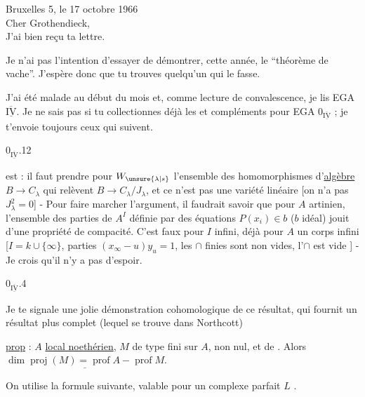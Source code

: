
Bruxelles 5, le 17 octobre 1966\\

Cher Grothendieck,\\

J'ai bien reçu ta lettre.

Je n'ai pas l'intention d'essayer de démontrer, cette année, le ``théorème de  vache''. J'espère donc que tu trouves quelqu'un qui le fasse.

J'ai été malade au début du mois et, comme lecture de convalescence, je lis EGA $\overline{\underline{\mathrm{IV}}}$. Je ne sais pas si tu collectionnes déjà les  et compléments pour EGA $0_{\overline{\underline{\mathrm{IV}}}}$ ; je t'envoie toujours ceux qui suivent.

$0_{\overline{\underline{\mathrm{IV}}}}$.12


est  : il faut prendre pour $W_{\unsure{\lambda|s}}$ l'ensemble des homomorphismes d'\uline{algèbre} $B\longrightarrow C_\lambda$ qui relèvent $B\longrightarrow C_\lambda/J_\lambda$, et ce n'est pas une variété linéaire [on n'a pas $J_\lambda^2=0$] - Pour faire marcher l'argument, il faudrait savoir que pour $A$ artinien, l'ensemble des parties de $A^I$ définie par  des équations $P(x_i)\in b$ ($b$ idéal) jouit d'une propriété de compacité. C'est faux pour $I$ infini, déjà pour $A$ un corps infini [$I=k\cup\{\infty\}$, parties $(x_\infty-u)y_u=1$, les $\cap$ finies sont non vides, l'$\cap$ est vide ] - Je crois qu'il n'y a pas d'espoir.

$0_{\overline{\underline{\mathrm{IV}}}}$.4

Je te signale une jolie démonstration cohomologique de ce résultat, qui fournit un résultat plus complet (lequel se trouve dans Northcott)


\uline{prop} : $A$ \uline{local noethérien}, $M$ de type fini sur $A$, non nul, et de . Alors $\underline{\dim\operatorname{proj}(M)=\operatorname{prof} A-\operatorname{prof} M}$.

On utilise la formule suivante, valable pour un complexe parfait $L$ .

